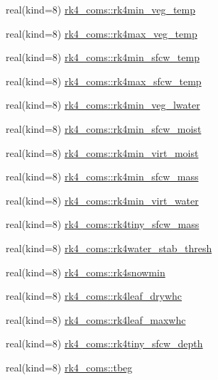 \begin{DoxyCompactItemize}
real(kind=8) \hyperlink{namespacerk4__coms_a47c8d9b57e934ed14af1cbf674ac8121}{rk4\+\_\+coms\+::rk4min\+\_\+veg\+\_\+temp}
\item 
real(kind=8) \hyperlink{namespacerk4__coms_a98bd8400baa088828a1aef2e4ecb1c65}{rk4\+\_\+coms\+::rk4max\+\_\+veg\+\_\+temp}
\item 
real(kind=8) \hyperlink{namespacerk4__coms_af9e3e44bc9f58496638933f7d9594172}{rk4\+\_\+coms\+::rk4min\+\_\+sfcw\+\_\+temp}
\item 
real(kind=8) \hyperlink{namespacerk4__coms_ad4588558a29ea0d798ee7146b3d2d403}{rk4\+\_\+coms\+::rk4max\+\_\+sfcw\+\_\+temp}
\item 
real(kind=8) \hyperlink{namespacerk4__coms_a72cb854b5fc4d3e198b318f596828d90}{rk4\+\_\+coms\+::rk4min\+\_\+veg\+\_\+lwater}
\item 
real(kind=8) \hyperlink{namespacerk4__coms_a6a0da8f33fe6255b50d37269cc4c5696}{rk4\+\_\+coms\+::rk4min\+\_\+sfcw\+\_\+moist}
\item 
real(kind=8) \hyperlink{namespacerk4__coms_a7de60af9cd3a8a43651da0ed30f0d878}{rk4\+\_\+coms\+::rk4min\+\_\+virt\+\_\+moist}
\item 
real(kind=8) \hyperlink{namespacerk4__coms_a59856872bd14cf839fe440bfe839560f}{rk4\+\_\+coms\+::rk4min\+\_\+sfcw\+\_\+mass}
\item 
real(kind=8) \hyperlink{namespacerk4__coms_a06cc5f6b7afaa313576b32bc56bf80d9}{rk4\+\_\+coms\+::rk4min\+\_\+virt\+\_\+water}
\item 
real(kind=8) \hyperlink{namespacerk4__coms_a546ef5b5ec1d1def51dcae82893eb2bc}{rk4\+\_\+coms\+::rk4tiny\+\_\+sfcw\+\_\+mass}
\item 
real(kind=8) \hyperlink{namespacerk4__coms_a9a7486e4755f548d744d266af9052d4f}{rk4\+\_\+coms\+::rk4water\+\_\+stab\+\_\+thresh}
\item 
real(kind=8) \hyperlink{namespacerk4__coms_a8d12416210875d4e246328901524e941}{rk4\+\_\+coms\+::rk4snowmin}
\item 
real(kind=8) \hyperlink{namespacerk4__coms_a3f7465768e9a9783cb2c7633da03acd6}{rk4\+\_\+coms\+::rk4leaf\+\_\+drywhc}
\item 
real(kind=8) \hyperlink{namespacerk4__coms_ac35950b114c389050144c9293d9a4e8a}{rk4\+\_\+coms\+::rk4leaf\+\_\+maxwhc}
\item 
real(kind=8) \hyperlink{namespacerk4__coms_a91e4907e16271a89cb5b965a061e20e2}{rk4\+\_\+coms\+::rk4tiny\+\_\+sfcw\+\_\+depth}
\item 
real(kind=8) \hyperlink{namespacerk4__coms_a9b09c4fc7f09c642c1115df229cedb1e}{rk4\+\_\+coms\+::tbeg}

\end{DoxyCompactItemize}
